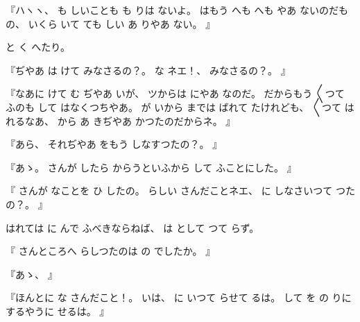 %
『ハヽヽ、
%
も
しいことも
も
りは
ないよ。
%
はもう
へも
へも
やあ
ないのだもの、
%
いくら
いて
ても
しい
あ
りやあ
ない。
』

%
と
く
へたり。

%
『ぢやあ
は
けて
みなさるの？。
%
な
ネエ！、
%
みなさるの？。
』

%
『なあに
けて
む
ぢやあ
いが、
%
ツからは
にやあ
なのだ。
%
だからもう
〳〵つて
ふのも
して
はなくつちやあ。
%
が
いから
までは
ばれて
たけれども、
%
〳〵つて
はれるなあ、
%
から
あ
きぢやあ
かつたのだからネ。
』

%
『あら、
%
それぢやあ
をもう
しなすつたの？。
』

%
『あゝ。
%
さんが
したら
からうといふから
して
ふことにした。
』

%
『
さんが
なことを
ひ
したの。
%
らしい
さんだことネエ、
%
に
しなさいつて
つたの？。
』

%
はれては
に
んで
ふべきならねば、
%
は
として
つて
らず。

%
『
さんところへ
らしつたのは
の
でしたか。
』

%
『あゝ、
』

%
『ほんとに
な
さんだこと！。
%
いは、
%
に
いつて
らせて
るは。
%
して
を
の
りにするやうに
せるは。
』

